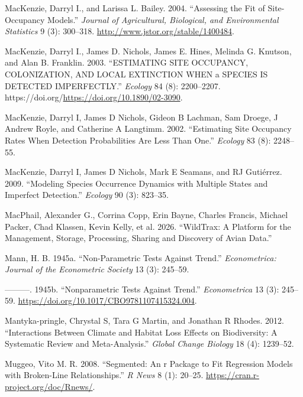 \documentclass[
  letterpaper,
  DIV=11,
  numbers=noendperiod]{scrartcl}
\newlength{\cslhangindent}
\newenvironment{CSLReferences}[2] %
 {\begin{list}{}{%
  \setlength{\itemindent}{0pt}
  \setlength{\leftmargin}{0pt}
  \setlength{\parsep}{0pt}
  \ifodd #1
   \setlength{\leftmargin}{\cslhangindent}
   \setlength{\itemindent}{-1\cslhangindent}
  \fi
  \setlength{\itemsep}{#2\baselineskip}}}
 {\end{list}}
\begin{document}
\begin{CSLReferences}{1}{0}
MacKenzie, Darryl I., and Larissa L. Bailey. 2004. {``Assessing the Fit
of Site-Occupancy Models.''} \emph{Journal of Agricultural, Biological,
and Environmental Statistics} 9 (3): 300--318.
\url{http://www.jstor.org/stable/1400484}.

MacKenzie, Darryl I., James D. Nichols, James E. Hines, Melinda G.
Knutson, and Alan B. Franklin. 2003. {``ESTIMATING SITE OCCUPANCY,
COLONIZATION, AND LOCAL EXTINCTION WHEN a SPECIES IS DETECTED
IMPERFECTLY.''} \emph{Ecology} 84 (8): 2200--2207.
https://doi.org/\url{https://doi.org/10.1890/02-3090}.

MacKenzie, Darryl I, James D Nichols, Gideon B Lachman, Sam Droege, J
Andrew Royle, and Catherine A Langtimm. 2002. {``Estimating Site
Occupancy Rates When Detection Probabilities Are Less Than One.''}
\emph{Ecology} 83 (8): 2248--55.

MacKenzie, Darryl I, James D Nichols, Mark E Seamans, and RJ Gutiérrez.
2009. {``Modeling Species Occurrence Dynamics with Multiple States and
Imperfect Detection.''} \emph{Ecology} 90 (3): 823--35.

MacPhail, Alexander G., Corrina Copp, Erin Bayne, Charles Francis,
Michael Packer, Chad Klassen, Kevin Kelly, et al. 2026. {``WildTrax: A
Platform for the Management, Storage, Processing, Sharing and Discovery
of Avian Data.''}

Mann, H. B. 1945a. {``Non-Parametric Tests Against Trend.''}
\emph{Econometrica: Journal of the Econometric Society} 13 (3): 245--59.

---------. 1945b. {``Nonparametric Tests Against Trend.''}
\emph{Econometrica} 13 (3): 245--59.
\url{https://doi.org/10.1017/CBO9781107415324.004}.

Mantyka-pringle, Chrystal S, Tara G Martin, and Jonathan R Rhodes. 2012.
{``Interactions Between Climate and Habitat Loss Effects on
Biodiversity: A Systematic Review and Meta-Analysis.''} \emph{Global
Change Biology} 18 (4): 1239--52.

Muggeo, Vito M. R. 2008. {``Segmented: An r Package to Fit Regression
Models with Broken-Line Relationships.''} \emph{R News} 8 (1): 20--25.
\url{https://cran.r-project.org/doc/Rnews/}.


\end{CSLReferences}
\end{document}
